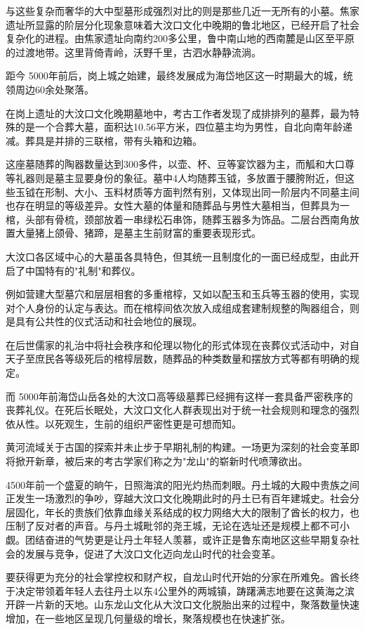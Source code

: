 与这些复杂而奢华的大中型墓形成强烈对比的则是那些几近一无所有的小墓。焦家遗址所显露的阶层分化现象意味着大汶口文化中晚期的鲁北地区，已经开启了社会复杂化的进程。由焦家遗址向南约200多公里，鲁中南山地的西南麓是山区至平原的过渡地带。这里背倚青岭，沃野千里，古泗水静静流淌。

距今 5000年前后，岗上城之始建，最终发展成为海岱地区这一时期最大的城，统领周边60余处聚落。

在岗上遗址的大汶口文化晚期墓地中，考古工作者发现了成排排列的墓葬，最为特殊的是一个合葬大墓，面积达10.56平方米，四位墓主均为男性，自北向南年龄递减。葬具是并排的三联棺，带有头箱和边箱。

这座墓随葬的陶器数量达到300多件，以壶、杯、豆等宴饮器为主，而觚和大口尊等礼器则是墓主显要身份的象征。墓中4人均随葬玉钺，多放置于腰胯附近，但这些玉钺在形制、大小、玉料材质等方面判然有别，又体现出同一阶层内不同墓主间也存在明显的等级差异。女性大墓的体量和随葬品与男性大墓相当，但葬具为一棺，头部有骨梳，颈部放着一串绿松石串饰，随葬玉器多为饰品。二层台西南角放置大量猪上颌骨、猪蹄，是墓主生前财富的重要表现形式。

大汶口各区域中心的大墓虽各具特色，但其统一且制度化的一面已经成型，由此开启了中国特有的"礼制"和葬仪。

例如营建大型墓穴和层层相套的多重棺椁，又如以配玉和玉兵等玉器的使用，实现对个人身份的认定与表达。而在棺椁间依次放入成组成套建制规整的陶器组合，则是具有公共性的仪式活动和社会地位的展现。

在后世儒家的礼治中将社会秩序和伦理以物化的形式体现在丧葬仪式活动中，对自天子至庶民各等级死后的棺椁层数，随葬品的种类数量和摆放方式等都有明确的规定。

而 5000年前海岱山岳各处的大汶口高等级墓葬已经拥有这样一套具备严密秩序的丧葬礼仪。在死后长眠处，大汶口文化人群表现出对于统一社会规则和理念的强烈依从性。以死观生，生前的组织严密性更是可想而知。

黄河流域关于古国的探索并未止步于早期礼制的构建。一场更为深刻的社会变革即将掀开新章，被后来的考古学家们称之为"龙山"的崭新时代喷薄欲出。

4500年前一个盛夏的晌午，日照海滨的阳光灼热而刺眼。丹土城的大殿中贵族之间正发生一场激烈的争吵，穿越大汶口文化晚期此时的丹土已有百年建城史。社会分层固化，年长的贵族们依靠血缘关系结成的权力网络大大的限制了酋长的权力，也压制了反对者的声音。与丹土城毗邻的尧王城，无论在选址还是规模上都不可小觑。团结奋进的气势更是让丹土年轻人羡慕，或许正是鲁东南地区这些早期复杂社会的发展与竞争，促进了大汶口文化迈向龙山时代的社会变革。

要获得更为充分的社会掌控权和财产权，自龙山时代开始的分家在所难免。酋长终于决定带领着年轻人去往丹土以东4公里外的两城镇，踌躇满志地要在这黄海之滨开辟一片新的天地。山东龙山文化从大汶口文化脱胎出来的过程中，聚落数量快速增加，在一些地区呈现几何量级的增长，聚落规模也在快速扩张。

